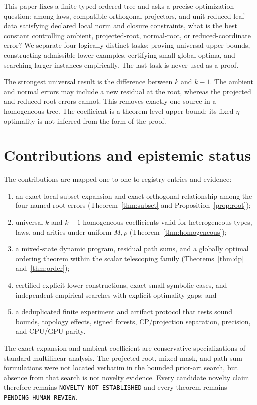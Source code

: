 \documentclass[11pt]{amsart}
\theoremstyle{definition}
\theoremstyle{remark}
\begin{document}
This paper fixes a finite typed ordered tree and asks a precise optimization
question: among laws, compatible orthogonal projectors, and unit reduced leaf
data satisfying declared local norm and closure constraints, what is the best
constant controlling ambient, projected-root, normal-root, or reduced-coordinate
error?  We separate four logically distinct tasks: proving universal upper
bounds, constructing admissible lower examples, certifying small global
optima, and searching larger instances empirically.  The last task is never
used as a proof.

The strongest universal result is the difference between \(k\) and \(k-1\).
The ambient and normal errors may include a new residual at the root, whereas
the projected and reduced root errors cannot.  This removes exactly one
source in a homogeneous tree.  The coefficient is a theorem-level upper
bound; its fixed-\(\eta\) optimality is not inferred from the form of the
proof.

\section{Contributions and epistemic status}

The contributions are mapped one-to-one to registry entries and evidence:

\begin{enumerate}[leftmargin=*]
\item an exact local subset expansion and exact orthogonal relationship among
the four named root errors (Theorem~\ref{thm:subset} and
Proposition~\ref{prop:root});
\item universal \(k\) and \(k-1\) homogeneous coefficients valid for
heterogeneous types, laws, and arities under uniform \(M,\rho\)
(Theorem~\ref{thm:homogeneous});
\item a mixed-state dynamic program, residual path sums, and a globally
optimal ordering theorem within the scalar telescoping family
(Theorems~\ref{thm:dp} and~\ref{thm:order});
\item certified explicit lower constructions, exact small symbolic cases,
and independent empirical searches with explicit optimality gaps; and
\item a deduplicated finite experiment and artifact protocol that tests sound
bounds, topology effects, signed forests, CP/projection separation, precision,
and CPU/GPU parity.
\end{enumerate}

The exact expansion and ambient coefficient are conservative specializations
of standard multilinear analysis.  The projected-root, mixed-mask, and
path-sum formulations were not located verbatim in the bounded prior-art
search, but absence from that search is not novelty evidence.  Every candidate
novelty claim therefore remains \texttt{NOVELTY\_NOT\_ESTABLISHED} and every
theorem remains \texttt{PENDING\_HUMAN\_REVIEW}.
\end{document}
